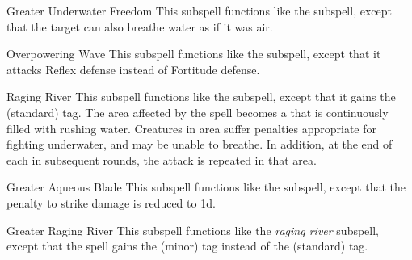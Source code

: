 \begin{ability}[\nth{3}]{Greater Underwater Freedom}
This subspell functions like the  subspell, except that the target can also breathe water as if it was air.
\end{ability}
\vspace{0.25em}


\begin{ability}[\nth{3}]{Overpowering Wave}
This subspell functions like the  subspell, except that it attacks Reflex defense instead of Fortitude defense.
\end{ability}
\vspace{0.25em}


\begin{ability}[\nth{3}]{Raging River}
This subspell functions like the  subspell, except that it gains the  (standard) tag.
The area affected by the spell becomes a  that is continuously filled with rushing water.
Creatures in area suffer penalties appropriate for fighting underwater, and may be unable to breathe.
In addition, at the end of each  in subsequent rounds, the attack is repeated in that area.
\end{ability}
\vspace{0.25em}


\begin{ability}[\nth{5}]{Greater Aqueous Blade}
This subspell functions like the  subspell, except that the penalty to strike damage is reduced to \minus1d.
\end{ability}
\vspace{0.25em}


\begin{ability}[\nth{6}]{Greater Raging River}
This subspell functions like the \textit{raging river} subspell, except that the spell gains the  (minor) tag instead of the  (standard) tag.
\end{ability}
\vspace{0.25em}


